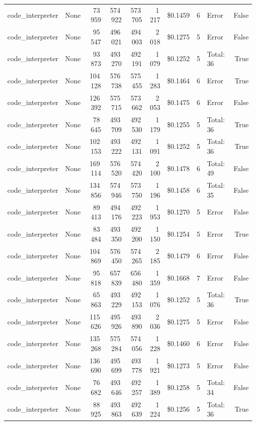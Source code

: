 \documentclass[a4paper,11pt]{article}
\begin{document}
\begin{table}[H]
{\begin{tabular}{l r r r r r r r l r}
code\_interpreter & None & 73\,959 & 574\,922 & 573\,705 & 1\,217 & \$0.1459 & 6 & Error & False \\
code\_interpreter & None & 95\,547 & 496\,021 & 494\,003 & 2\,018 & \$0.1275 & 5 & Error & False \\
code\_interpreter & None & 93\,873 & 493\,270 & 492\,191 & 1\,079 & \$0.1252 & 5 & Total: 36 & True \\
code\_interpreter & None & 104\,128 & 576\,738 & 575\,455 & 1\,283 & \$0.1464 & 6 & Error & True \\
code\_interpreter & None & 126\,392 & 575\,715 & 573\,662 & 2\,053 & \$0.1475 & 6 & Error & False \\
code\_interpreter & None & 78\,645 & 493\,709 & 492\,530 & 1\,179 & \$0.1255 & 5 & Total: 36 & True \\
code\_interpreter & None & 102\,153 & 493\,222 & 492\,131 & 1\,091 & \$0.1252 & 5 & Total: 36 & True \\
code\_interpreter & None & 169\,114 & 576\,520 & 574\,420 & 2\,100 & \$0.1478 & 6 & Total: 49 & False \\
code\_interpreter & None & 134\,856 & 574\,946 & 573\,750 & 1\,196 & \$0.1458 & 6 & Total: 35 & False \\
code\_interpreter & None & 89\,413 & 494\,176 & 492\,223 & 1\,953 & \$0.1270 & 5 & Error & False \\
code\_interpreter & None & 83\,484 & 493\,350 & 492\,200 & 1\,150 & \$0.1254 & 5 & Error & True \\
code\_interpreter & None & 104\,869 & 576\,450 & 574\,265 & 2\,185 & \$0.1479 & 6 & Error & False \\
code\_interpreter & None & 95\,818 & 657\,839 & 656\,480 & 1\,359 & \$0.1668 & 7 & Error & False \\
code\_interpreter & None & 65\,863 & 493\,229 & 492\,153 & 1\,076 & \$0.1252 & 5 & Total: 36 & True \\
code\_interpreter & None & 115\,626 & 495\,926 & 493\,890 & 2\,036 & \$0.1275 & 5 & Error & False \\
code\_interpreter & None & 135\,268 & 575\,284 & 574\,056 & 1\,228 & \$0.1460 & 6 & Error & False \\
code\_interpreter & None & 136\,690 & 495\,699 & 493\,778 & 1\,921 & \$0.1273 & 5 & Error & False \\
code\_interpreter & None & 76\,682 & 493\,646 & 492\,257 & 1\,389 & \$0.1258 & 5 & Total: 34 & False \\
code\_interpreter & None & 88\,925 & 493\,863 & 492\,639 & 1\,224 & \$0.1256 & 5 & Total: 36 & True \\

\end{tabular}}
\end{table}
\end{document}
